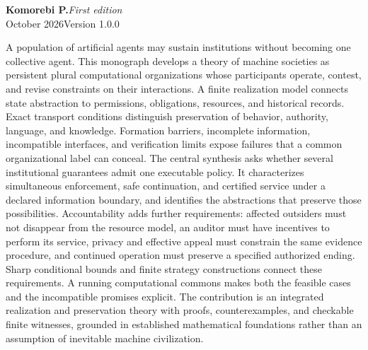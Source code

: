 \documentclass[11pt,letterpaper]{article}
\theoremstyle{plain}
\theoremstyle{definition}
\theoremstyle{remark}
\begin{document}
\hypersetup{pageanchor=false}
\begin{titlepage}
\thispagestyle{empty}
\vspace*{.25in}
\par
\vspace{.67in}
\vspace{.18in}
\vspace{.27in}
\noindent{\color{ink}\rule{\textwidth}{0.85pt}}\par
\vspace{.16in}
\noindent\textbf{Komorebi P.}\hfill\textit{First edition}\\
 October 2026\hfill Version 1.0.0\par
\vspace{.48in}
\par\smallskip
\noindent A population of artificial agents may sustain institutions without becoming one collective agent. This monograph develops a theory of machine societies as persistent plural computational organizations whose participants operate, contest, and revise constraints on their interactions. A finite realization model connects state abstraction to permissions, obligations, resources, and historical records. Exact transport conditions distinguish preservation of behavior, authority, language, and knowledge. Formation barriers, incomplete information, incompatible interfaces, and verification limits expose failures that a common organizational label can conceal. The central synthesis asks whether several institutional guarantees admit one executable policy. It characterizes simultaneous enforcement, safe continuation, and certified service under a declared information boundary, and identifies the abstractions that preserve those possibilities. Accountability adds further requirements: affected outsiders must not disappear from the resource model, an auditor must have incentives to perform its service, privacy and effective appeal must constrain the same evidence procedure, and continued operation must preserve a specified authorized ending. Sharp conditional bounds and finite strategy constructions connect these requirements. A running computational commons makes both the feasible cases and the incompatible promises explicit. The contribution is an integrated realization and preservation theory with proofs, counterexamples, and checkable finite witnesses, grounded in established mathematical foundations rather than an assumption of inevitable machine civilization.


\end{titlepage}
\end{document}

